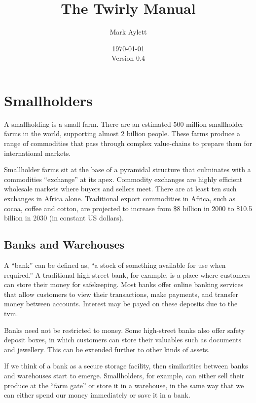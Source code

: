 \documentclass[11pt,a4paper]{article}
\begin{document}
\title{The Twirly Manual}
\author{Mark Aylett}
\date{\today\\Version 0.4}
\maketitle

\tableofcontents

\section{Smallholders}

A smallholding is a small farm. There are an estimated 500 million smallholder farms in the world,
supporting almost 2 billion people. These farms produce a range of commodities that pass through
complex value-chains to prepare them for international \glspl{market}.

Smallholder farms sit at the base of a pyramidal structure that culminates with a commodities
``\gls{exchange}'' at its apex. Commodity \glspl{exchange} are highly efficient wholesale
\glspl{market} where buyers and sellers meet. There are at least ten such \glspl{exchange} in Africa
alone. Traditional export commodities in Africa, such as cocoa, coffee and cotton, are projected to
increase from \$8 billion in 2000 to \$10.5 billion in 2030 (in constant US dollars).

\subsection{Banks and Warehouses}

A ``bank'' can be defined as, ``a stock of something available for use when required.'' A
traditional high-street bank, for example, is a place where customers can store their money for
safekeeping. Most banks offer online banking services that allow customers to view their
transactions, make payments, and transfer money between accounts. Interest may be payed on these
deposits due to the \gls{tvm}.

Banks need not be restricted to money. Some high-street banks also offer safety deposit boxes, in
which customers can store their valuables such as documents and jewellery. This can be extended
further to other kinds of assets.

If we think of a bank as a secure storage facility, then similarities between banks and
\glspl{warehouse} start to emerge. Smallholders, for example, can either sell their produce at the
``farm gate'' or store it in a \gls{warehouse}, in the same way that we can either spend our money
immediately or save it in a bank.
\end{document}
